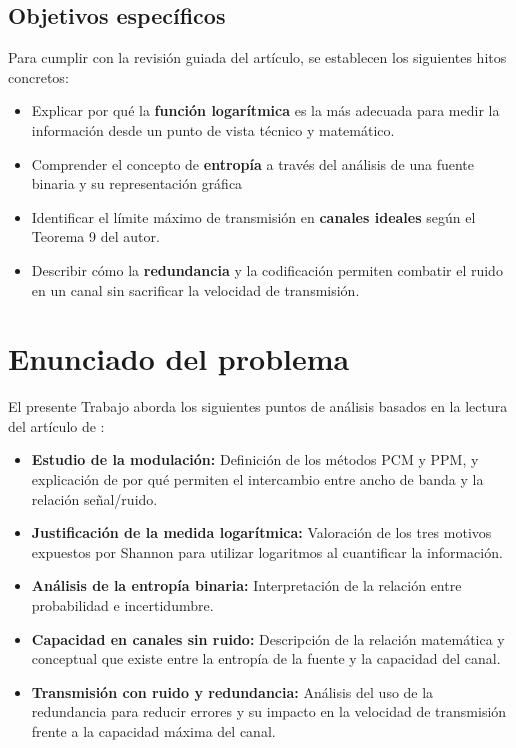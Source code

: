 \documentclass[11pt,a4paper,spanish]{book}
\begin{document}
\section{Objetivos específicos}

Para cumplir con la revisión guiada del artículo, se establecen los siguientes hitos concretos:

\begin{itemize}
    \item Explicar por qué la \textbf{función logarítmica} es la más adecuada para medir la información desde un punto de vista técnico y matemático.
    \item Comprender el concepto de \textbf{entropía} a través del análisis de una fuente binaria y su representación gráfica
    \item Identificar el límite máximo de transmisión en \textbf{canales ideales} según el Teorema 9 del autor.
    \item Describir cómo la \textbf{redundancia} y la codificación permiten combatir el ruido en un canal sin sacrificar la velocidad de transmisión.
\end{itemize}

\chapter{Enunciado del problema}

El presente Trabajo aborda los siguientes puntos de análisis basados en la lectura del artículo de \citet{shannon1948}:

\begin{itemize}
    \item \textbf{Estudio de la modulación:} Definición de los métodos PCM y PPM, y explicación de por qué permiten el intercambio entre ancho de banda y la relación señal/ruido.
    \item \textbf{Justificación de la medida logarítmica:} Valoración de los tres motivos expuestos por Shannon para utilizar logaritmos al cuantificar la información.
    \item \textbf{Análisis de la entropía binaria:} Interpretación de la relación entre probabilidad e incertidumbre.
    \item \textbf{Capacidad en canales sin ruido:} Descripción de la relación matemática y conceptual que existe entre la entropía de la fuente y la capacidad del canal.
    \item \textbf{Transmisión con ruido y redundancia:} Análisis del uso de la redundancia para reducir errores y su impacto en la velocidad de transmisión frente a la capacidad máxima del canal.
\end{itemize}
\end{document}
